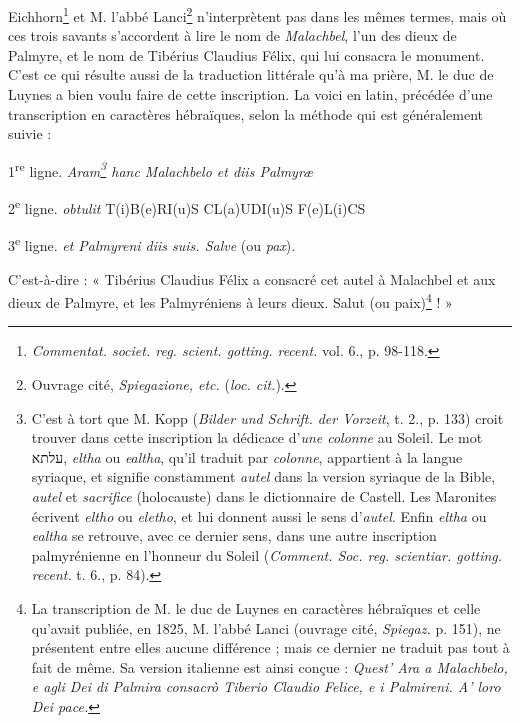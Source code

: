 \documentclass{article}
\begin{document}
Eichhorn\footnote{\emph{Commentat. societ. reg. scient. gotting. recent.} vol. 6., p. 98-118.} et M. l'abbé Lanci\footnote{Ouvrage cité, \emph{Spiegazione, etc.} (\emph{loc. cit.}).} n'interprètent pas dans les mêmes termes, mais où ces trois savants s'accordent à lire le nom de \emph{Malachbel}, l'un des dieux de Palmyre, et le nom de Tibérius Claudius Félix, qui lui consacra le monument. C'est ce qui résulte aussi de la traduction littérale qu'à ma prière, M. le duc de Luynes a bien voulu faire de cette inscription. La voici en latin, précédée d'une transcription en caractères hébraïques, selon la méthode qui est généralement suivie :

\begin{center}
1\textsuperscript{re} ligne. \emph{Aram\footnote{C'est à tort que M. Kopp (\emph{Bilder und Schrift. der Vorzeit}, t. 2., p. 133) croit trouver dans cette inscription la dédicace d'\emph{une colonne} au Soleil. Le mot \texthebrew{עלתא}, \emph{eltha} ou \emph{ealtha}, qu'il traduit par \emph{colonne}, appartient à la langue syriaque, et signifie constamment \emph{autel} dans la version syriaque de la Bible, \emph{autel} et \emph{sacrifice} (holocauste) dans le dictionnaire de Castell. Les Maronites écrivent \emph{eltho} ou \emph{eletho}, et lui donnent aussi le sens d'\emph{autel}. Enfin \emph{eltha} ou \emph{ealtha} se retrouve, avec ce dernier sens, dans une autre inscription palmyrénienne en l'honneur du Soleil (\emph{Comment. Soc. reg. scientiar. gotting. recent.} t. 6., p. 84).} hanc Malachbelo et diis Palmyræ}

2\textsuperscript{e} ligne. \emph{obtulit} T(i)B(e)RI(u)S CL(a)UDI(u)S F(e)L(i)CS

3\textsuperscript{e} ligne. \emph{et Palmyreni diis suis. Salve} (ou \emph{pax}).
\end{center}
\hspace*{0mm}C'est-à-dire : « Tibérius Claudius Félix a consacré cet autel à Malachbel et aux dieux de Palmyre, et les Palmyréniens à leurs dieux. Salut (ou paix)\footnote{La transcription de M. le duc de Luynes en caractères hébraïques et celle qu'avait publiée, en 1825, M. l'abbé Lanci (ouvrage cité, \emph{Spiegaz.} p. 151), ne présentent entre elles aucune différence ; mais ce dernier ne traduit pas tout à fait de même. Sa version italienne est ainsi conçue : \emph{Quest' Ara a Malachbelo, e agli Dei di Palmira consacrò Tiberio Claudio Felice, e i Palmireni. A' loro Dei pace.}} ! »
\end{document}
